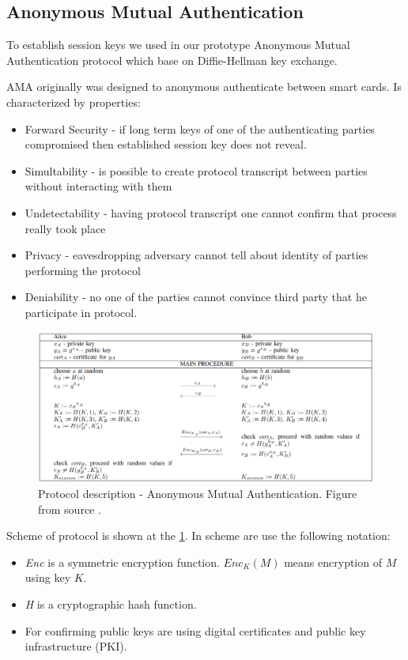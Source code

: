 \documentclass[11pt,titlepage]{article}
\theoremstyle{plain}
\begin{document}
\subsection{Anonymous Mutual Authentication}
To establish session keys we used in our prototype Anonymous Mutual Authentication protocol which base on Diffie-Hellman key exchange. 

\vspace{5mm}

AMA originally was designed to anonymous authenticate between smart cards. Is characterized by properties:
\begin{itemize}
\item Forward Security - if long term keys of one of the authenticating parties compromised then established session key does not reveal.
\item Simultability - is possible to create protocol transcript between parties without interacting with them
\item Undetectability - having protocol transcript one cannot confirm that process really took place
\item Privacy - eavesdropping adversary cannot tell about identity of parties performing the protocol
\item Deniability - no one of the parties cannot convince third party that he participate in protocol.
\end{itemize}

\begin{figure}[H]
	\centering
	\includegraphics[width=1.2\textwidth]{img/AMA_protocol}
	\caption{Protocol description - Anonymous Mutual Authentication. Figure from source \cite{AMA}.}
	\label{fig:F8}
\end{figure}

Scheme of protocol is shown at the \ref{fig:F8}. In scheme are use the following notation:
\begin{itemize}
\item \textit{Enc} is a symmetric encryption function. \textit{$Enc_K(M)$} means encryption of $M$ using key $K$. 
\item \textit{H} is a cryptographic hash function. 
\item For confirming public keys are using digital certificates and public key infrastructure (PKI).
\end{itemize}
\end{document}
